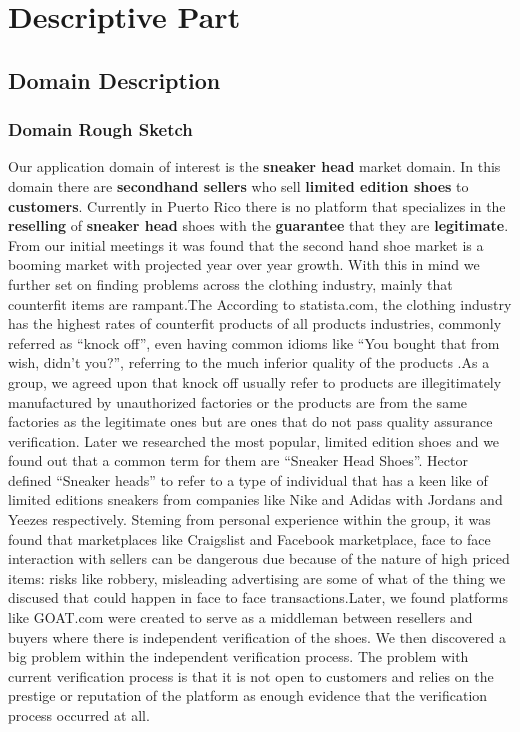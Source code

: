 \chapter{Descriptive Part}
\newpage
\section{Domain Description}
\subsection{Domain Rough Sketch}
Our application domain of interest is the \textbf{sneaker head} market domain. In this domain there are \textbf{secondhand sellers} who sell \textbf{limited edition shoes} to \textbf{customers}. Currently in Puerto Rico there is no platform that specializes in the \textbf{reselling} of \textbf{sneaker head} shoes with the \textbf{guarantee} that they are \textbf{legitimate}. From our initial meetings it was found that the second hand shoe market is a booming market with projected year over year growth. With this in mind we further set on finding problems across the clothing industry, mainly that counterfit items are rampant.The According to statista.com, the clothing industry has the highest rates of counterfit products of all products industries, commonly referred as ``knock off'', even having common idioms like ``You bought that from wish, didn't you?'', referring to the much inferior quality of the products \cite{InfographicIndustriesMost2019}.As a group, we agreed upon that knock off usually refer to products are illegitimately manufactured by unauthorized factories or the products are from the same factories as the legitimate ones but are ones that do not pass quality assurance verification. Later we researched the most popular, limited edition shoes and we found out that a common term for them are ``Sneaker Head Shoes''. Hector defined ``Sneaker heads'' to refer to a type of individual that has a keen like of limited editions sneakers from companies like Nike and Adidas with Jordans and Yeezes respectively. Steming from personal experience within the group, it was found that marketplaces like Craigslist and Facebook marketplace, face to face interaction with sellers can be dangerous due because of the nature of high priced items: risks like robbery, misleading advertising are some of what of the thing we discused that could happen in face to face transactions.Later, we found platforms like GOAT.com were created to serve as a middleman between resellers and buyers where there is independent verification of the shoes. We then discovered a big problem within the independent verification process. The problem with  current verification process is that it is not open to customers and relies on the prestige or reputation of the platform as enough evidence that the verification process occurred at all.
